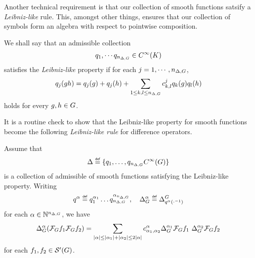 Another technical requirement is that our collection of smooth functions satsify a \emph{Leibniz-like} rule.
This, amongst other things, ensures that our collection of symbols form an algebra with respect to pointwise composition.

\begin{definition}
\label{definition:Leibniz-like_property_for_smooth_functions}
    We shall say that an admissible collection
    \begin{align*}
        q_1, \cdots q_{n_{\Delta, G}} \in {C^\infty(K)}
    \end{align*}
    satisfies the \emph{Leibniz-like} property
    if for each $j = 1, \cdots, n_{\Delta, G}$,
    \begin{align*}
        q_j(g h) = q_j(g) + q_j(h) + \sum_{1 \leq k, l \leq n_{\Delta, G}} c^j_{k, l} q_k(g) q_l(h)
    \end{align*}
    holds for every $g, h \in G$.
\end{definition}

It is a routine check to show that the Leibniz-like property for smooth functions
become the following \emph{Leibniz-like rule} for difference operators.

\begin{lemma}
\label{lemma:Leibniz-like_property_for_difference_operators}
    Assume that
    \begin{align*}
        \Delta \defeq \{q_1, \dots, q_{\dimDifferenceOperators} \SmoothFunctions \Group\}
    \end{align*}
    is a collection of admissible of smooth functions satisfying the Leibniz-like property.
    Writing
    \begin{align*}
        q^\alpha \defeq q^{\alpha_1}_1 \dots q^{\alpha_{\dimDifferenceOperators}}_{\dimDifferenceOperators},
        \quad \DifferenceOperatorOrder {\alpha} \defeq \DifferenceOperator {q^\alpha(\dummy^{-1})}
    \end{align*}
    for each $\alpha \in \mathbb{N}^{n_{\Delta, G}}$,
    we have
    \begin{align*}
        {\Delta_{G}^{\alpha}}
        (\mathcal{F}_{G} f_1 \mathcal{F}_{G} f_2)
        =
        \sum_{\left|{\alpha}\right| \leq \left|{\alpha_1}\right| + \left|{\alpha_2}\right| \leq 2 \left|{\alpha}\right|}
        c^{\alpha}_{\alpha_1, \alpha_2}
        {\Delta_{G}^{\alpha_1}} \mathcal{F}_{G} {f_1} \
        {\Delta_{G}^{\alpha_2}} \mathcal{F}_{G} {f_2}
    \end{align*}
    for each $f_1, f_2 \in {\mathcal{S}' (G)}$.
\end{lemma}

